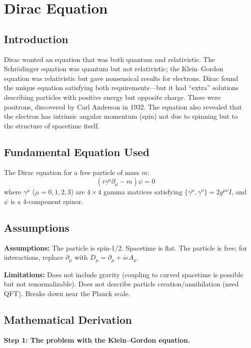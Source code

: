 \documentclass[11pt,openright]{book}
\begin{document}

\chapter{Dirac Equation}

\section*{Introduction}

Dirac wanted an equation that was both quantum and relativistic. The Schr\"odinger equation was quantum but not relativistic; the Klein--Gordon equation was relativistic but gave nonsensical results for electrons. Dirac found the unique equation satisfying both requirements---but it had ``extra'' solutions describing particles with positive energy but opposite charge. These were positrons, discovered by Carl Anderson in 1932. The equation also revealed that the electron has intrinsic angular momentum (spin) not due to spinning but to the structure of spacetime itself.
\section*{Fundamental Equation Used}

The Dirac equation for a free particle of mass $m$:
\[
(i\gamma^\mu \partial_\mu - m)\psi = 0
\]
where $\gamma^\mu$ ($\mu = 0,1,2,3$) are $4\times 4$ gamma matrices satisfying $\{\gamma^\mu, \gamma^\nu\} = 2g^{\mu\nu}I$, and $\psi$ is a 4-component spinor.
\section*{Assumptions}

\textbf{Assumptions:} The particle is spin-1/2. Spacetime is flat. The particle is free; for interactions, replace $\partial_\mu$ with $D_\mu = \partial_\mu + ieA_\mu$.


\textbf{Limitations:} Does not include gravity (coupling to curved spacetime is possible but not renormalizable). Does not describe particle creation/annihilation (need QFT). Breaks down near the Planck scale.


\section*{Mathematical Derivation}

\textbf{Step 1: The problem with the Klein--Gordon equation.}
\end{document}
